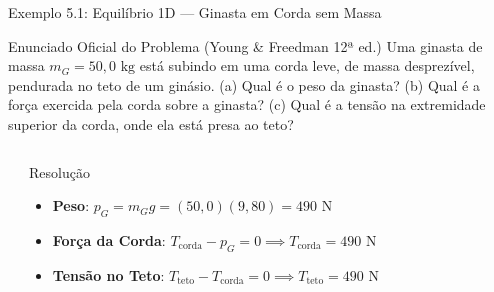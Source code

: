 \documentclass[10pt,aspectratio=169]{beamer}
\begin{document}
\begin{frame}{Exemplo 5.1: Equilíbrio 1D --- Ginasta em Corda sem Massa}
    \begin{block}{Enunciado Oficial do Problema (Young \& Freedman 12ª ed.)}
        \small
        Uma ginasta de massa $m_G = 50{,}0\text{ kg}$ está subindo em uma corda leve, de massa desprezível, pendurada no teto de um ginásio. (a) Qual é o peso da ginasta? (b) Qual é a força exercida pela corda sobre a ginasta? (c) Qual é a tensão na extremidade superior da corda, onde ela está presa ao teto?
    \end{block}
    \begin{columns}[T]
        \begin{center}
        \end{center}
        \begin{exampleblock}{Resolução}
            \small
            \begin{itemize}\setlength{\itemsep}{3pt}
                \item \textbf{Peso}: $p_G = m_G g = (50{,}0)(9{,}80) = 490\text{ N}$
                \item \textbf{Força da Corda}: $T_{\text{corda}} - p_G = 0 \implies T_{\text{corda}} = 490\text{ N}$
                \item \textbf{Tensão no Teto}: $T_{\text{teto}} - T_{\text{corda}} = 0 \implies T_{\text{teto}} = 490\text{ N}$
            \end{itemize}
        \end{exampleblock}
    \end{columns}
\end{frame}
\end{document}
